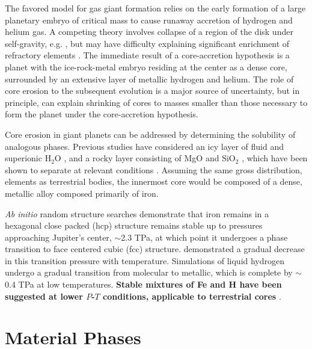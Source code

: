The favored model for gas giant formation
\citep{mizuno78,bodenheimer86,pollack96} relies on the early
formation of a large planetary embryo of critical mass to cause runaway
accretion of hydrogen and helium gas. A competing theory involves collapse of
a region of the disk under self-gravity, e.g. \citep{boss97}, but may
have difficulty explaining significant enrichment of refractory elements \citep{hubbard02,guillot05}.
The immediate result of a core-accretion hypothesis is a planet with the
ice-rock-metal embryo residing at the center as a dense core, surrounded by an
extensive layer of metallic hydrogen and helium. The role of core erosion to
the subsequent evolution is a major source of uncertainty, but in principle, can explain shrinking of
cores to masses smaller than those necessary to form the planet under the
core-accretion hypothesis.

Core erosion in giant planets can be addressed by determining the solubility 
of analogous phases. Previous studies have considered an icy
layer of fluid and superionic $\mathrm{H}_2\mathrm{O}$
\citep{wilson12a,wilson13}, and a rocky layer consisting of
MgO \citep{wilson12b} and $\mathrm{SiO}_2$ \citep{gonzalez13}, which have been
shown to separate at relevant conditions \citep{umemoto06}. Assuming the
same gross distribution, elements as terrestrial bodies, the innermost core
would be composed of a dense, metallic alloy composed primarily of iron.

{\it Ab initio} random structure searches
\citep{pickard09} demonstrate that iron remains in a hexagonal close packed (hcp) structure
remains stable up to pressures approaching Jupiter's center, $\sim$2.3 TPa, at
which point it undergoes a phase transition to face centered cubic (fcc)
structure. \citet{stixrude12} demonstrated a gradual decrease in this transition
pressure with temperature. Simulations of liquid hydrogen
\citep{militzer08,militzer13,mcmahon12} undergo a gradual transition from molecular to
metallic, which is complete by $\sim$ 0.4 TPa at low temperatures. {\bf Stable
mixtures of Fe and H have been suggested at lower $P$-$T$ conditions,
applicable to terrestrial cores } \citep{bazhanova12}. 

\section{Material Phases}


